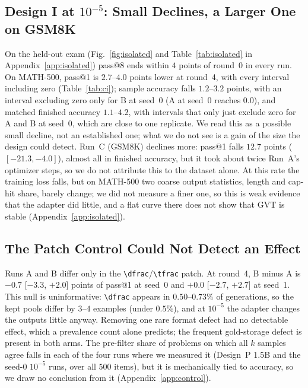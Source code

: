 \documentclass[runningheads]{llncs}
\begin{document}
\subsection{Design I at $10^{-5}$: Small Declines, a Larger One on GSM8K}
\label{sec:isolated}

On the held-out exam (Fig.~\ref{fig:isolated} and Table~\ref{tab:isolated} in Appendix~\ref{app:isolated}) pass@8
ends within $4$ points of round~0 in every run. On MATH-500, pass@1 is
$2.7$--$4.0$ points lower at round~4, with every interval including zero
(Table~\ref{tab:ci}); sample accuracy falls $1.2$--$3.2$ points, with an
interval excluding zero only for B at seed~0 (A at seed~0 reaches $0.0$), and
matched finished accuracy $1.1$--$4.2$, with intervals that only just exclude
zero for A and B at seed~0, which are close to one replicate. We read this as a
possible small decline, not an established one; what we do not see is a gain
of the size the design could detect. Run~C
(GSM8K) declines more: pass@1 falls $12.7$ points ($[-21.3,-4.0]$), almost all in
finished accuracy, but it took about twice Run~A's optimizer steps, so we do not
attribute this to the dataset alone. At this rate the training loss falls, but
on MATH-500 two coarse output statistics, length and cap-hit share, barely
change; we did not measure a finer one, so this is weak evidence that the
adapter did little, and a flat curve there does not show that GVT is stable
(Appendix~\ref{app:isolated}).

\subsection{The Patch Control Could Not Detect an Effect}
\label{sec:control}
\label{sec:prevalence}
\label{sec:answer-diversity}

Runs A and B differ only in the \verb|\dfrac|/\verb|\tfrac| patch. At round~4,
B minus A is $-0.7$ [$-3.3$, $+2.0$] points of pass@1 at seed~0 and $+0.0$
[$-2.7$, $+2.7$] at seed~1. This null is uninformative: \verb|\dfrac| appears
in $0.50$--$0.73\%$ of generations, so the kept pools differ by $3$--$4$
examples (under $0.5\%$), and at $10^{-5}$ the adapter changes the outputs
little anyway. Removing one rare format defect had no detectable effect, which a
prevalence count alone predicts; the frequent gold-storage defect is present in
both arms. The pre-filter share of problems on which all $k$ samples agree falls
in each of the four runs where we measured it (Design~P 1.5B and the seed-0
$10^{-5}$ runs, over all $500$ items), but it is mechanically tied to accuracy,
so we draw no conclusion from it (Appendix~\ref{app:control}).
\end{document}

